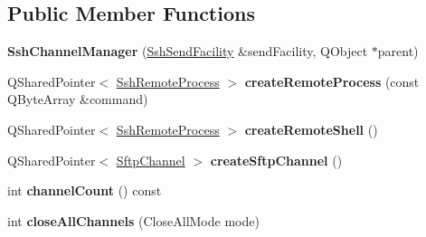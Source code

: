 \subsection*{Public Member Functions}
\begin{DoxyCompactItemize}
\item 
\mbox{\label{class_q_ssh_1_1_internal_1_1_ssh_channel_manager_a61c65f4120f6006017a7dbad5681492d}} 
{\bfseries Ssh\+Channel\+Manager} (\mbox{\hyperlink{class_q_ssh_1_1_internal_1_1_ssh_send_facility}{Ssh\+Send\+Facility}} \&send\+Facility, Q\+Object $\ast$parent)
\item 
\mbox{\label{class_q_ssh_1_1_internal_1_1_ssh_channel_manager_a7018116d06b1eb167266705030a8d007}} 
Q\+Shared\+Pointer$<$ \mbox{\hyperlink{class_q_ssh_1_1_ssh_remote_process}{Ssh\+Remote\+Process}} $>$ {\bfseries create\+Remote\+Process} (const Q\+Byte\+Array \&command)
\item 
\mbox{\label{class_q_ssh_1_1_internal_1_1_ssh_channel_manager_a4c1f65f75ea945c5408213435c8096d0}} 
Q\+Shared\+Pointer$<$ \mbox{\hyperlink{class_q_ssh_1_1_ssh_remote_process}{Ssh\+Remote\+Process}} $>$ {\bfseries create\+Remote\+Shell} ()
\item 
\mbox{\label{class_q_ssh_1_1_internal_1_1_ssh_channel_manager_a0d1059115bc0d5995c0a674503433b87}} 
Q\+Shared\+Pointer$<$ \mbox{\hyperlink{class_q_ssh_1_1_sftp_channel}{Sftp\+Channel}} $>$ {\bfseries create\+Sftp\+Channel} ()
\item 
\mbox{\label{class_q_ssh_1_1_internal_1_1_ssh_channel_manager_a064b2c49733742e5fc99a43a2a2603ca}} 
int {\bfseries channel\+Count} () const
\item 
\mbox{\label{class_q_ssh_1_1_internal_1_1_ssh_channel_manager_a50cdc1a51e41f40b53ae8ce0127304da}} 
int {\bfseries close\+All\+Channels} (Close\+All\+Mode mode)
\item 
\mbox{\label{class_q_ssh_1_1_internal_1_1_ssh_channel_manager_a80f692fe9cc0f033c1bb0fd53fd338c1}} 

\end{DoxyCompactItemize}
